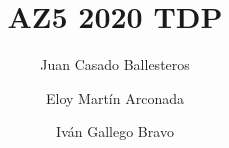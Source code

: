 %

\documentclass[runningheads,a4paper]{llncs}
\usepackage{amssymb}
\setcounter{tocdepth}{3}
\usepackage{graphicx}
\usepackage{amssymb}
\usepackage{enumitem}
\usepackage[utf8]{inputenc}
\usepackage[hidelinks]{hyperref}
\usepackage{url}
\usepackage{float}
\usepackage{amsmath}
\usepackage{graphicx}
\usepackage{wrapfig}
\usepackage{fancyhdr}
\usepackage{titling}
\usepackage{xcolor}
\usepackage{lipsum}



%
\title{AZ5 2020 TDP}

\author{Juan Casado Ballesteros \and Eloy Martín Arconada \and Iván Gallego Bravo}



\maketitle

